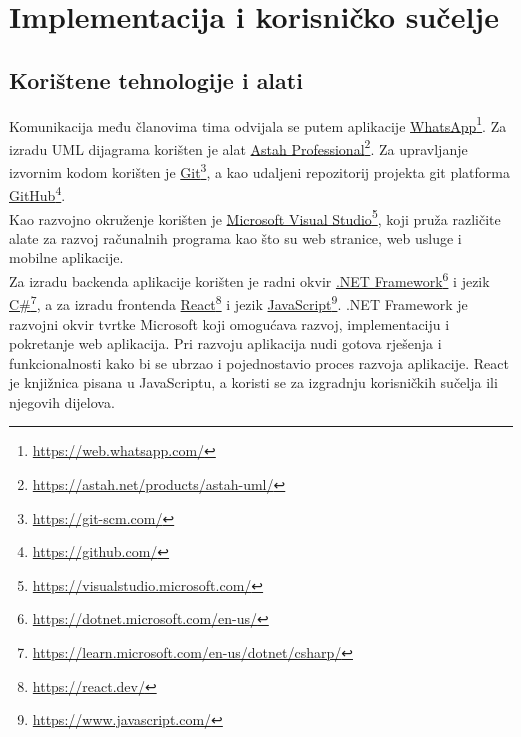 \chapter{Implementacija i korisničko sučelje}
		
		
		\section{Korištene tehnologije i alati}
		
			
			
			Komunikacija među članovima tima odvijala se putem aplikacije \underline{WhatsApp}\footnote[1]{\href{https://web.whatsapp.com/}{https://web.whatsapp.com/}}. Za izradu UML dijagrama korišten je alat \underline{Astah Professional}\footnote[2]{\href{https://astah.net/products/astah-uml/}{https://astah.net/products/astah-uml/}}. Za upravljanje izvornim kodom korišten je \underline{Git}\footnote[3]{\href{https://git-scm.com/}{https://git-scm.com/}}, a kao udaljeni repozitorij projekta git platforma \underline{GitHub}\footnote[4]{\href{https://github.com/}{https://github.com/}}.\\
			Kao razvojno okruženje korišten je \underline{Microsoft Visual Studio}\footnote[5]{\href{https://visualstudio.microsoft.com/}{https://visualstudio.microsoft.com/}}, koji pruža različite alate za razvoj računalnih programa kao što su web stranice, web usluge i mobilne aplikacije.\\
			Za izradu backenda aplikacije korišten je radni okvir \underline{.NET Framework}\footnote[6]{\href{https://dotnet.microsoft.com/en-us/}{https://dotnet.microsoft.com/en-us/}} i jezik \underline{C\#}\footnote[7]{\href{https://learn.microsoft.com/en-us/dotnet/csharp/}{https://learn.microsoft.com/en-us/dotnet/csharp/}}, a za izradu frontenda \underline{React}\footnote[8]{\href{https://react.dev/}{https://react.dev/}} i jezik \underline{JavaScript}\footnote[9]{\href{https://www.javascript.com/}{https://www.javascript.com/}}. .NET Framework je razvojni okvir tvrtke Microsoft koji omogućava razvoj, implementaciju i pokretanje web aplikacija. Pri razvoju aplikacija nudi gotova rješenja i funkcionalnosti kako bi se ubrzao i pojednostavio proces razvoja aplikacije. React je knjižnica pisana u JavaScriptu, a koristi se za izgradnju korisničkih sučelja ili njegovih dijelova.
			
